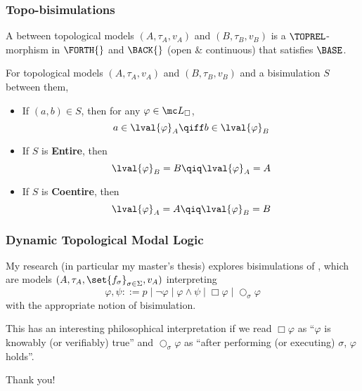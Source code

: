 {\begin{frame}
    \end{frame}

    \begin{frame}
        \frametitle{Topo-bisimulations}

         A  between topological models $(A,\tau_A,v_A)$ and $(B,\tau_B,v_B)$ is a $\TOPREL$-morphism in $\FORTH{}$ and $\BACK{}$ (open \& continuous) that satisfies $\BASE$.\pause

         For topological models $(A,\tau_A,v_A)$ and $(B,\tau_B,v_B)$ and a bisimulation $S$ between them,
            \begin{itemize}
                \item If $(a,b)\in S$, then for any $\varphi\in\mc L_{\Box}$,
                    \vspace{-0.3cm}\[ a\in\lval{\varphi}_A \qiff b\in\lval{\varphi}_B \]\pause
                    \item \vspace{-0.75cm}If $S$ is \textbf{Entire}, then
                    \[ \lval{\varphi}_B=B \qiq \lval{\varphi}_A=A \]\pause
                \item \vspace{-0.75cm} If $S$ is \textbf{Coentire}, then
                    \vspace{-0.3cm}\[ \lval{\varphi}_A=A \qiq \lval{\varphi}_B=B \]
            \end{itemize}

    \end{frame}

    \begin{frame}
        \frametitle{Dynamic Topological Modal Logic}

        My research (in particular my master's thesis) explores bisimulations of , which are models $(A,\tau_A,\set{f_{\sigma}}_{\sigma\in\Sigma},v_A)$ interpreting
        \[ \varphi,\psi ::= p \mid \neg\varphi \mid \varphi\land\psi \mid \Box\varphi \mid \bigcirc_{\sigma}\varphi \]\pause
        with the appropriate notion of bisimulation.\pause

        \vspace{1cm}

        This has an interesting philosophical interpretation if we read $\Box\varphi$ as ``$\varphi$ is knowably (or verifiably) true'' and $\bigcirc_{\sigma}\varphi$ as ``after performing (or executing) $\sigma$, $\varphi$ holds''.
    \end{frame}


    \begin{frame}[plain]
        \begin{center}
        Thank you!
        \end{center}
    \end{frame}

}
